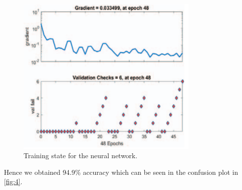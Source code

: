 \begin{itemize}
\begin{figure}[h!]
\end{figure}
\begin{figure}[h!]
	\centering	
	\includegraphics[width=3.5in]{8.png} %
	\caption{   Training state for the neural network.}
	\label{fig:8} %
	
\end{figure}
Hence we obtained 94.9\% accuracy which can be seen in the confusion plot in \ref{fig:4}.
\end{itemize}

